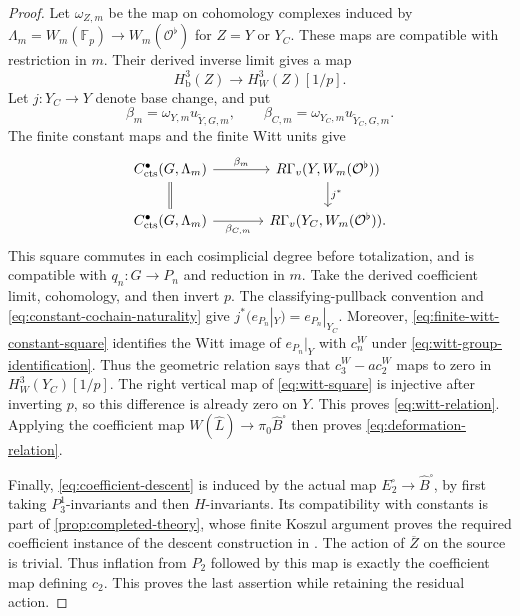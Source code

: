 \documentclass[11pt]{article}
\numberwithin{equation}{section}
\theoremstyle{definition}
\theoremstyle{remark}
\begin{document}
\begin{proof}
Let $\omega_{Z,m}$ be the map on cohomology complexes induced by
$\Lambda_m=W_m(\mathbb F_p)\to W_m(\mathcal O^\flat)$ for $Z=Y$ or $Y_C$.
These maps are compatible with restriction in $m$.  Their derived
inverse limit gives a map
\[
 H^3_{\mathrm b}(Z)\longrightarrow H_W^3(Z)[1/p].
\]
Let $j:Y_C\to Y$ denote base change, and put
\[
 \beta_m=\omega_{Y,m}u_{\widetilde Y,G,m},\qquad
 \beta_{C,m}=\omega_{Y_C,m}u_{\widetilde Y_C,G,m}.
\]
The finite constant maps and the finite Witt units give
\begin{equation}\label{eq:finite-witt-base-change}
\begin{tikzcd}[column sep=large]
 C_{\mathrm{cts}}^{\bullet}(G,\Lambda_m)
      \arrow[r,"\beta_m"] \arrow[d,equal]
   &R\Gamma_v(Y,W_m(\mathcal O^\flat))\arrow[d,"j^*"]\\
 C_{\mathrm{cts}}^{\bullet}(G,\Lambda_m)
      \arrow[r,"\beta_{C,m}"']
   &R\Gamma_v(Y_C,W_m(\mathcal O^\flat)).
\end{tikzcd}
\end{equation}
This square commutes in each cosimplicial degree before totalization,
and is compatible with $q_n:G\to P_n$ and reduction in $m$.
Take the derived coefficient limit, cohomology, and then invert $p$.
The classifying-pullback convention and
\eqref{eq:constant-cochain-naturality} give
$j^*(e_{P_n}|_Y)=e_{P_n}|_{Y_C}$. Moreover,
\eqref{eq:finite-witt-constant-square} identifies the Witt image of
$e_{P_n}|_Y$ with $c_n^W$ under
\eqref{eq:witt-group-identification}. Thus the geometric relation says
that $c_3^W-a c_2^W$ maps to zero in $H_W^3(Y_C)[1/p]$.
The right vertical map of \eqref{eq:witt-square} is injective after
inverting $p$, so this difference is already zero on $Y$. This proves
\eqref{eq:witt-relation}. Applying the coefficient map
$W(\widehat L)\to\pi_0\widehat B^{\square}$ then proves
\eqref{eq:deformation-relation}.

Finally, \eqref{eq:coefficient-descent} is induced by the actual map
$E_2^{\square}\to\widehat B^{\square}$, by first taking
$P_3^1$-invariants and then $H$-invariants.  Its compatibility with
constants is part of \cref{prop:completed-theory}, whose finite Koszul
argument proves the required coefficient instance of the descent
construction in \cite[Proposition~4.6.12]{BMR2026}.
The action of $\overline Z$ on the source is trivial.  Thus
inflation from $P_2$ followed by this map is exactly the coefficient
map defining $c_2$.  This proves the last assertion while retaining
the residual action.
\end{proof}
\end{document}
